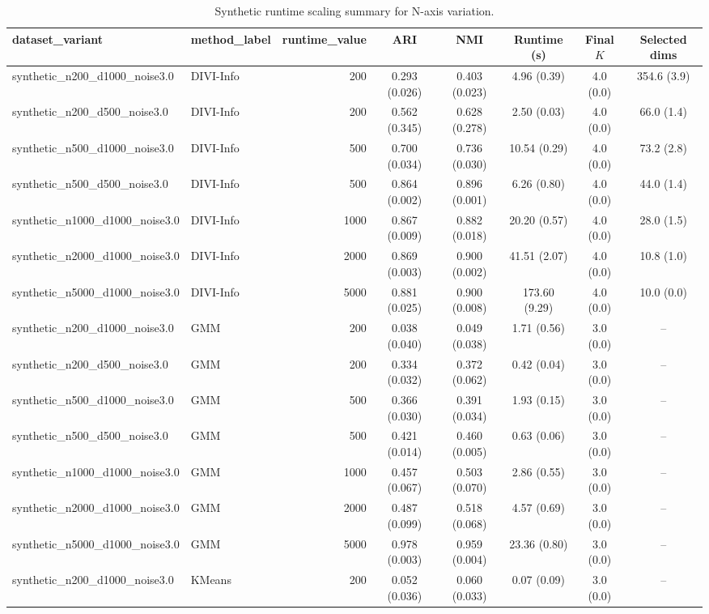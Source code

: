 \begin{table}[t]
\centering
\caption{Synthetic runtime scaling summary for N-axis variation.}
\label{tab:runtime-nscale}
\begin{tabular}{llrccccc}
\toprule
dataset_variant & method_label & runtime_value & ARI & NMI & Runtime (s) & Final $K$ & Selected dims \\
\midrule
synthetic_n200_d1000_noise3.0 & DIVI-Info & 200 & 0.293 (0.026) & 0.403 (0.023) & 4.96 (0.39) & 4.0 (0.0) & 354.6 (3.9) \\
synthetic_n200_d500_noise3.0 & DIVI-Info & 200 & 0.562 (0.345) & 0.628 (0.278) & 2.50 (0.03) & 4.0 (0.0) & 66.0 (1.4) \\
synthetic_n500_d1000_noise3.0 & DIVI-Info & 500 & 0.700 (0.034) & 0.736 (0.030) & 10.54 (0.29) & 4.0 (0.0) & 73.2 (2.8) \\
synthetic_n500_d500_noise3.0 & DIVI-Info & 500 & 0.864 (0.002) & 0.896 (0.001) & 6.26 (0.80) & 4.0 (0.0) & 44.0 (1.4) \\
synthetic_n1000_d1000_noise3.0 & DIVI-Info & 1000 & 0.867 (0.009) & 0.882 (0.018) & 20.20 (0.57) & 4.0 (0.0) & 28.0 (1.5) \\
synthetic_n2000_d1000_noise3.0 & DIVI-Info & 2000 & 0.869 (0.003) & 0.900 (0.002) & 41.51 (2.07) & 4.0 (0.0) & 10.8 (1.0) \\
synthetic_n5000_d1000_noise3.0 & DIVI-Info & 5000 & 0.881 (0.025) & 0.900 (0.008) & 173.60 (9.29) & 4.0 (0.0) & 10.0 (0.0) \\
synthetic_n200_d1000_noise3.0 & GMM & 200 & 0.038 (0.040) & 0.049 (0.038) & 1.71 (0.56) & 3.0 (0.0) & -- \\
synthetic_n200_d500_noise3.0 & GMM & 200 & 0.334 (0.032) & 0.372 (0.062) & 0.42 (0.04) & 3.0 (0.0) & -- \\
synthetic_n500_d1000_noise3.0 & GMM & 500 & 0.366 (0.030) & 0.391 (0.034) & 1.93 (0.15) & 3.0 (0.0) & -- \\
synthetic_n500_d500_noise3.0 & GMM & 500 & 0.421 (0.014) & 0.460 (0.005) & 0.63 (0.06) & 3.0 (0.0) & -- \\
synthetic_n1000_d1000_noise3.0 & GMM & 1000 & 0.457 (0.067) & 0.503 (0.070) & 2.86 (0.55) & 3.0 (0.0) & -- \\
synthetic_n2000_d1000_noise3.0 & GMM & 2000 & 0.487 (0.099) & 0.518 (0.068) & 4.57 (0.69) & 3.0 (0.0) & -- \\
synthetic_n5000_d1000_noise3.0 & GMM & 5000 & 0.978 (0.003) & 0.959 (0.004) & 23.36 (0.80) & 3.0 (0.0) & -- \\
synthetic_n200_d1000_noise3.0 & KMeans & 200 & 0.052 (0.036) & 0.060 (0.033) & 0.07 (0.09) & 3.0 (0.0) & -- \\

\end{tabular}
\end{table}
